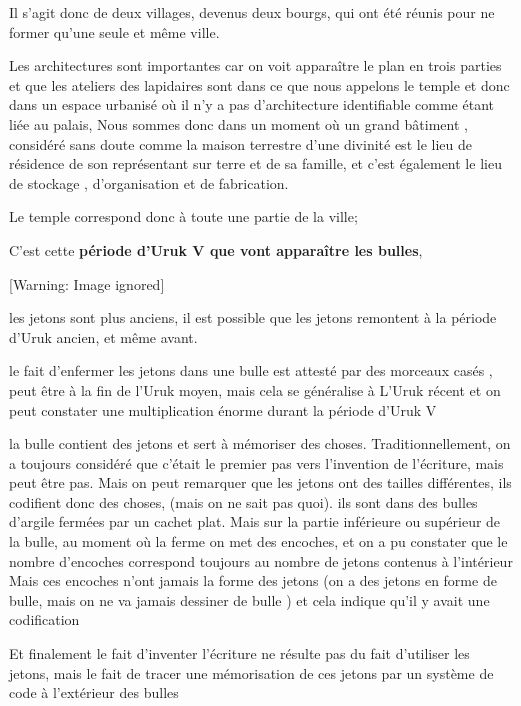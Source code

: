 \documentclass[a4paper,10pt]{article}
\begin{document}
\begin{itemize}
Il s'agit donc de deux villages, devenus deux bourgs,
qui ont été réunis pour ne former qu'une seule et même
ville.

Les architectures sont importantes car on voit apparaître le plan en
trois parties et que les ateliers des lapidaires sont dans ce que nous
appelons le temple et donc dans un espace urbanisé où il
n'y a pas d'architecture 
identifiable comme étant liée au palais,  Nous sommes donc dans un
moment où un grand bâtiment , considéré sans doute comme la maison
terrestre d'une divinité est le lieu de résidence de
son représentant sur terre et de sa famille, et c'est
également le lieu de stockage , d'organisation et de
fabrication.

Le temple correspond donc à toute une partie de la ville;

C'est  cette \textbf{période d'Uruk V
que vont apparaître les bulles}, 

  [Warning: Image ignored] %
 

les jetons sont plus anciens, il est possible que les jetons remontent à
la période d'Uruk ancien, et même avant.

le fait d'enfermer les jetons dans une bulle est
attesté par des morceaux casés , peut être à la fin de
l'Uruk moyen, mais cela se généralise à
L'Uruk récent et on peut constater une multiplication
énorme durant la période d'Uruk V

la bulle contient des jetons et sert à mémoriser des choses.
Traditionnellement, on a toujours considéré que
c'était le premier pas vers
l'invention de l'écriture, mais peut
être pas. Mais on peut remarquer que les jetons ont des tailles
différentes, ils codifient donc des choses, (mais on ne sait pas quoi).
ils sont dans des bulles d'argile fermées par un
cachet plat. Mais sur la partie inférieure ou supérieur de la bulle, au
moment où la ferme on met des encoches, et on a pu constater que le
nombre d'encoches correspond toujours au nombre de
jetons contenus à l'intérieur Mais ces encoches
n'ont jamais la forme des jetons  (on a des jetons en
forme de bulle, mais on ne va jamais dessiner de bulle ) et cela
indique qu'il y avait une codification

Et finalement le fait d'inventer
l'écriture ne résulte pas du fait
d'utiliser les jetons, mais le fait de tracer une
mémorisation de ces jetons par un système de code à
l'extérieur des bulles


\end{itemize}
\end{document}
